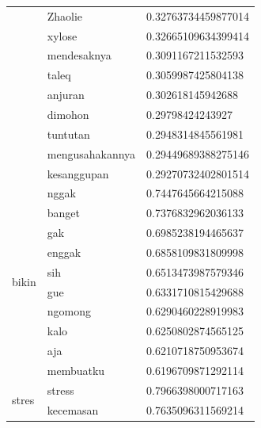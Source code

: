 \begin{enumerate}
\begin{longtable}[c]{|l|l|l|}
                                  & Zhaolie         & 0.32763734459877014 \\ \cline{2-3}
                                  & xylose          & 0.32665109634399414 \\ \cline{2-3}
                                  & mendesaknya     & 0.3091167211532593  \\ \cline{2-3}
                                  & taleq           & 0.3059987425804138  \\ \cline{2-3}
                                  & anjuran         & 0.302618145942688   \\ \cline{2-3}
                                  & dimohon         & 0.29798424243927    \\ \cline{2-3}
                                  & tuntutan        & 0.2948314845561981  \\ \cline{2-3}
                                  & mengusahakannya & 0.29449689388275146 \\ \cline{2-3}
                                  & kesanggupan     & 0.29270732402801514 \\ \hline
    \multirow[t]{10}{*}{bikin}    & nggak           & 0.7447645664215088  \\ \cline{2-3}
                                  & banget          & 0.7376832962036133  \\ \cline{2-3}
                                  & gak             & 0.6985238194465637  \\ \cline{2-3}
                                  & enggak          & 0.6858109831809998  \\ \cline{2-3}
                                  & sih             & 0.6513473987579346  \\ \cline{2-3}
                                  & gue             & 0.6331710815429688  \\ \cline{2-3}
                                  & ngomong         & 0.6290460228919983  \\ \cline{2-3}
                                  & kalo            & 0.6250802874565125  \\ \cline{2-3}
                                  & aja             & 0.6210718750953674  \\ \cline{2-3}
                                  & membuatku       & 0.6196709871292114  \\ \hline
    \multirow[t]{10}{*}{stres}    & stress          & 0.7966398000717163  \\ \cline{2-3}
                                  & kecemasan       & 0.7635096311569214  \\ \cline{2-3}

\end{longtable}
\end{enumerate}
